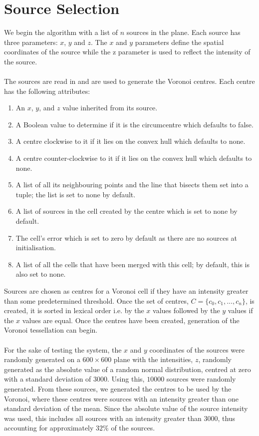 \section{Source Selection}\label{sec:design:source}
We begin the algorithm with a list of $n$ sources in the plane. Each source has three parameters: $x$, $y$ and $z$. The $x$ and $y$ parameters define the spatial coordinates of the source while the z parameter is used to reflect the intensity of the source.
\\
\\
The sources are read in and are used to generate the Voronoi centres. Each centre has the following attributes:
\begin{enumerate}
\item An $x$, $y$, and $z$ value inherited from its source.
\item A Boolean value to determine if it is the circumcentre which defaults to false.
\item A centre clockwise to it if it lies on the convex hull which defaults to none.
\item A centre counter-clockwise to it if it lies on the convex hull which defaults to none.
\item A list of all its neighbouring points and the line that bisects them set into a tuple; the list is set to none by default.
\item A list of sources in the cell created by the centre which is set to none by default.
\item The cell's error which is set to zero by default as there are no sources at initialisation.
\item A list of all the cells that have been merged with this cell; by default, this is also set to none.
\end{enumerate} 
Sources are chosen as centres for a Voronoi cell if they have an intensity greater than some predetermined threshold. Once the set of centres, $C= \{c_0,c_1,...,c_n\}$, is created, it is sorted in lexical order i.e. by the $x$ values followed by the $y$ values if the $x$ values are equal. Once the centres have been created, generation of the Voronoi tessellation can begin.
\\
\\
For the sake of testing the system, the $x$ and $y$ coordinates of the sources were randomly generated on a $600 \times 600$ plane with the intensities, $z$, randomly generated as the absolute value of a random normal distribution, centred at zero with a standard deviation of $3000$. Using this, $10000$ sources were randomly generated. From these sources, we generated the centres to be used by the Voronoi, where these centres were sources with an intensity greater than one standard deviation of the mean. Since the absolute value of the source intensity was used, this includes all sources with an intensity greater than 3000, thus accounting for approximately $32\%$ of the sources.
